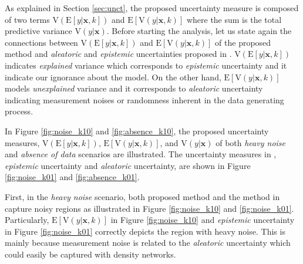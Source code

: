 \documentclass[letterpaper, 10 pt, conference]{ieeeconf}  %
\def\Bx{\mathbf{x}} \def\By{\mathbf{y}} \def\Bp{\mathbf{p}}
\begin{document}
As explained in Section \ref{sec:unct}, the proposed uncertainty measure
is composed of two terms 
$\mathrm{V}(\mathrm{E}[y|\Bx, k])$
and $\mathrm{E}[\mathrm{V}(y|\Bx, k)]$ 
where the sum is the total predictive variance
$\mathrm{V}(y|\Bx)$.
Before starting the analysis,  
let us state again the connections between
$\mathrm{V}(\mathrm{E}[y|\Bx, k])$ and 
$\mathrm{E}[\mathrm{V}(y|\Bx, k)]$ of the proposed method and 
\textit{aleatoric} and \textit{epistemic} uncertainties
proposed in \cite{Kendall_17}. 
$\mathrm{V}(\mathrm{E}[y|\Bx, k])$ indicates 
\textit{explained} variance which
corresponds to \textit{epistemic} uncertainty
and it indicate our ignorance about the model.
On the other hand, 
$\mathrm{E}[\mathrm{V}(y|\Bx, k)]$ models
\textit{unexplained} variance and it corresponds to
\textit{aleatoric} uncertainty indicating measurement noises
or randomness inherent in the data generating process. 


In Figure \ref{fig:noise_k10} and \ref{fig:absence_k10}, 
the proposed uncertainty measures, 
$\mathrm{V}(\mathrm{E}[y|\Bx, k])$, $\mathrm{E}[\mathrm{V}(y|\Bx, k)]$, 
and $\mathrm{V}(y|\Bx)$ of both 
\textit{heavy noise} and \textit{absence of data}
scenarios are illustrated. 
The uncertainty measures in \cite{Kendall_17},
\textit{epistemic} uncertainty and \textit{aleatoric} uncertainty,
are shown in Figure \ref{fig:noise_k01} and \ref{fig:absence_k01}.


First, in the \textit{heavy noise} scenario, both proposed method and 
the method in \cite{Kendall_17} capture noisy regions as
illustrated in Figure \ref{fig:noise_k10} and \ref{fig:noise_k01}.
Particularly,  
$\mathrm{E}[\mathrm{V}(y|\Bx, k)]$ in 
Figure \ref{fig:noise_k10}
and
\textit{epistemic} uncertainty in 
Figure \ref{fig:noise_k01}
correctly depicts the region with heavy noise.
This is mainly because measurement noise is related to
the \textit{aleatoric} uncertainty which could easily be captured
with density networks.
\end{document}
